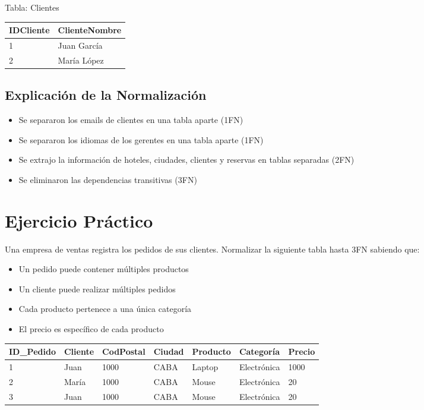 \documentclass[12pt]{article}
\begin{document}
Tabla: Clientes
\begin{center}
\begin{tabular}{ll}
\toprule
IDCliente & ClienteNombre \\
\midrule
1 & Juan García \\
2 & María López \\
\bottomrule
\end{tabular}
\end{center}

\subsection{Explicación de la Normalización}
\begin{itemize}
    \item Se separaron los emails de clientes en una tabla aparte (1FN)
    \item Se separaron los idiomas de los gerentes en una tabla aparte (1FN)
    \item Se extrajo la información de hoteles, ciudades, clientes y reservas en tablas separadas (2FN)
    \item Se eliminaron las dependencias transitivas (3FN)
\end{itemize}

\section{Ejercicio Práctico}
Una empresa de ventas registra los pedidos de sus clientes. Normalizar la siguiente tabla hasta 3FN sabiendo que:

\begin{itemize}
    \item Un pedido puede contener múltiples productos
    \item Un cliente puede realizar múltiples pedidos
    \item Cada producto pertenece a una única categoría
    \item El precio es específico de cada producto
\end{itemize}

\begin{center}
\begin{tabular}{lllllll}
\toprule
ID\_Pedido & Cliente & CodPostal & Ciudad & Producto & Categoría & Precio \\
\midrule
1 & Juan & 1000 & CABA & Laptop & Electrónica & 1000 \\
2 & María & 1000 & CABA & Mouse & Electrónica & 20 \\
3 & Juan & 1000 & CABA & Mouse & Electrónica & 20 \\
\bottomrule
\end{tabular}
\end{center}
\end{document}

